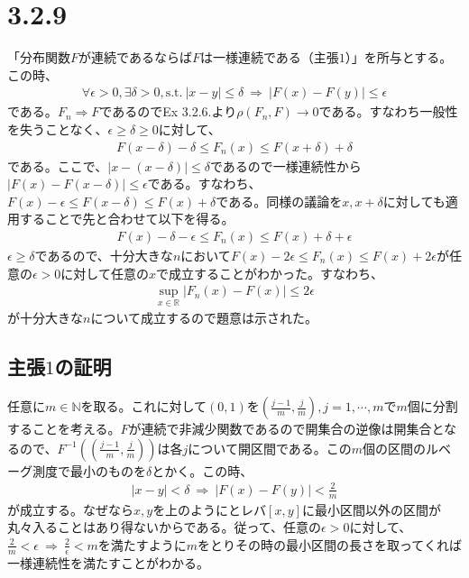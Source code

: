 \documentclass{article}
\begin{document}
\section{3.2.9}
「分布関数$F$が連続であるならば$F$は一様連続である（主張$1$）」を所与とする。この時、
\begin{align*}
	\forall \epsilon > 0, \exists \delta > 0, \text{s.t.}\ |x-y| \leq \delta\ \Rightarrow\ \left| F(x) - F(y) \right| \leq \epsilon
\end{align*}
である。$F_n \Rightarrow F$であるのでEx 3.2.6.より$\rho\left( F_n, F \right) \to 0$である。すなわち一般性を失うことなく、$\epsilon \geq \delta \geq 0$に対して、
\begin{align*}
	F\left( x-\delta \right) -\delta \leq F_n(x) \leq F(x + \delta) + \delta
\end{align*}
である。ここで、$|x - (x-\delta)| \leq \delta$であるので一様連続性から$\left| F(x) - F(x-\delta) \right| \leq \epsilon$である。すなわち、$F(x) - \epsilon \leq F(x - \delta) \leq F(x) + \delta$である。同様の議論を$x, x+\delta$に対しても適用することで先と合わせて以下を得る。
\begin{align*}
	F(x) - \delta - \epsilon \leq F_n(x) \leq F(x) + \delta + \epsilon
\end{align*}
$\epsilon \geq \delta$であるので、十分大きな$n$において$F(x) - 2\epsilon \leq F_n(x) \leq F(x)+ 2\epsilon$が任意の$\epsilon > 0$に対して任意の$x$で成立することがわかった。すなわち、
\begin{align*}
	\sup_{x\in \mathbb{R}} \left| F_n(x) - F(x) \right| \leq 2\epsilon
\end{align*}
が十分大きな$n$について成立するので題意は示された。

\subsection{主張$1$の証明}
任意に$m \in \mathbb{N}$を取る。これに対して$(0,1)$を$\left( \frac{j-1}{m}, \frac{j}{m} \right), j = 1,\cdots, m$で$m$個に分割することを考える。$F$が連続で非減少関数であるので開集合の逆像は開集合となるので、$F^{-1}\left( \left( \frac{j-1}{m}, \frac{j}{m} \right) \right)$は各$j$について開区間である。この$m$個の区間のルベーグ測度で最小のものを$\delta$とかく。この時、
\begin{align*}
	|x-y| < \delta\ \Rightarrow\ \left| F(x) - F(y) \right| < \frac{2}{m}
\end{align*}
が成立する。なぜなら$x,y$を上のようにとレバ$[x, y]$に最小区間以外の区間が丸々入ることはあり得ないからである。従って、任意の$\epsilon > 0$に対して、$\frac{2}{m} < \epsilon\ \Rightarrow\ \frac{2}{\epsilon} < m$を満たすように$m$をとりその時の最小区間の長さを取ってくれば一様連続性を満たすことがわかる。
\end{document}
